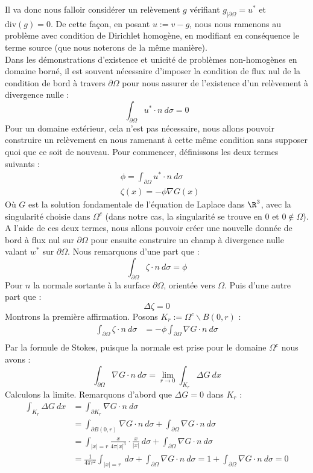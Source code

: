 Il va donc nous falloir considérer un relèvement $g$ vérifiant $g_{|\partial \Omega} = u^*$ et $\text{div}(g) = 0$. De cette façon, en posant $u := v - g$, nous nous ramenons au problème avec condition de Dirichlet homogène, en modifiant en conséquence le terme source (que nous noterons de la même manière).\\
Dans les démonstrations d'existence et unicité de problèmes non-homogènes en domaine borné, il est souvent nécessaire d'imposer la condition de flux nul de la condition de bord à travers $\partial \Omega$ pour nous assurer de l'existence d'un relèvement à divergence nulle : 
$$\int_{\partial \Omega} u^* \cdot n \ d\sigma = 0 $$
Pour un domaine extérieur, cela n'est pas nécessaire, nous allons pouvoir construire un relèvement en nous ramenant à cette même condition sans supposer quoi que ce soit de nouveau.
Pour commencer, définissons les deux termes suivants :
\begin{align*}
    &\phi = \int_{\partial \Omega} u^* \cdot n \ d\sigma \\
    &\zeta(x) = - \phi \nabla G(x)
\end{align*}
Où $G$ est la solution fondamentale de l'équation de Laplace dans $\R^3$, avec la singularité choisie dans $\Omega^c$ (dans notre cas, la singularité se trouve en 0 et $0 \notin \Omega$).
A l'aide de ces deux termes, nous allons pouvoir créer une nouvelle donnée de bord à flux nul sur $\partial \Omega$ pour ensuite construire un champ à divergence nulle valant $w^*$ sur $\partial \Omega$.
Nous remarquons d'une part que :
$$ \int_{\partial \Omega} \zeta \cdot n \ d\sigma = \phi $$
Pour $n$ la normale sortante à la surface $\partial \Omega$, orientée vers $\Omega$. Puis d'une autre part que :
$$ \Delta \zeta = 0 $$
Montrons la première affirmation. Posons $K_r := \Omega^c \backslash B(0,r)$ :
\begin{align*}
    \int_{\partial \Omega} \zeta \cdot n \ d\sigma &= - \phi \int_{\partial \Omega} \nabla G \cdot n \ d\sigma \\
\end{align*}
Par la formule de Stokes, puisque la normale est prise pour le domaine $\Omega^c$ nous avons :
$$ \int_{\partial \Omega} \nabla G \cdot n \ d\sigma = \underset{r \to 0}{\lim}  \int_{K_r} \Delta G \ dx $$
Calculons la limite. Remarquons d'abord que $\Delta G = 0$ dans $K_r$ :
\begin{align*}
    \int_{K_r} \Delta G \ dx &= \int_{\partial K_r} \nabla G \cdot n \ d\sigma \\
    &= \int_{\partial B(0,r)} \nabla G \cdot n \ d\sigma + \int_{\partial \Omega} \nabla G \cdot n \ d\sigma \\
    &= \int_{|x| = r} \frac{x}{4\pi |x|^3} \cdot \frac{x}{|x|} \ d\sigma + \int_{\partial \Omega} \nabla G \cdot n \ d\sigma \\
    &= \frac{1}{4\pi r^2} \int_{|x| = r} \ d\sigma + \int_{\partial \Omega} \nabla G \cdot n \ d\sigma = 1 + \int_{\partial \Omega} \nabla G \cdot n \ d\sigma = 0
\end{align*}
